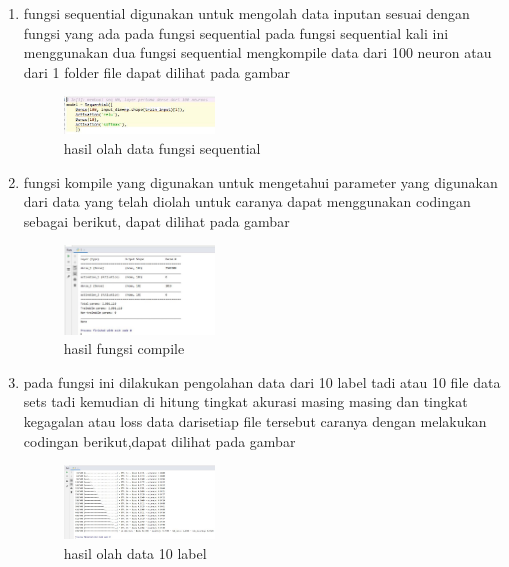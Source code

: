 \begin{enumerate}
        \item  fungsi sequential digunakan untuk mengolah data inputan sesuai dengan fungsi yang ada pada fungsi sequential pada fungsi sequential kali ini menggunakan dua fungsi sequential mengkompile data dari 100 neuron atau dari 1 folder file dapat dilihat pada gambar
        \begin{figure}[H]
            \includegraphics[width=4cm]{figures/1174039/chapter6/7.jpg}
            \centering
            \caption{hasil olah data fungsi sequential}
        \end{figure}
        
        \item  fungsi kompile yang digunakan untuk mengetahui parameter yang digunakan dari data yang telah diolah untuk caranya dapat menggunakan codingan sebagai berikut, dapat dilihat pada gambar
        \begin{figure}[H]
            \includegraphics[width=4cm]{figures/1174039/chapter6/8.jpg}
            \centering
            \caption{hasil fungsi compile}
        \end{figure}
        
        \item  pada fungsi ini dilakukan pengolahan data dari 10 label tadi atau 10 file data sets tadi kemudian di hitung tingkat akurasi masing masing dan tingkat kegagalan atau loss data darisetiap file tersebut caranya dengan melakukan codingan berikut,dapat dilihat pada gambar
        \begin{figure}[H]
            \includegraphics[width=4cm]{figures/1174039/chapter6/9.jpg}
            \centering
            \caption{hasil olah data 10 label}
        \end{figure}
        

\end{enumerate}
